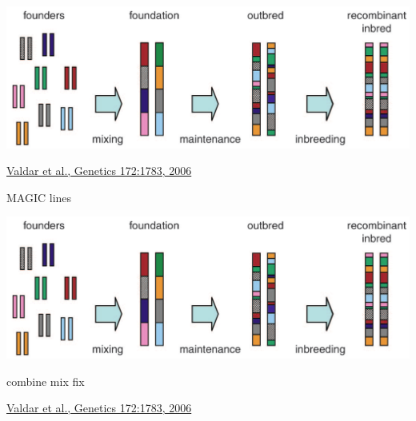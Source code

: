 \documentclass[12pt]{article}
\newcommand{\headsize}{\fontsize{35}{35} \selectfont}
\newcommand{\smallsize}{\fontsize{25}{30} \selectfont}
\newcommand{\smallestsize}{\fontsize{18}{22} \selectfont}
\begin{document}
\vspace{20mm}

\centerline{\includegraphics[width=10in]{Figs/valdar_genet2006.png}}

\vfill

\hfill {\smallestsize \color{myblue} \href{http://www.ncbi.nlm.nih.gov/pmc/articles/PMC1456308/}{Valdar et al., Genetics 172:1783, 2006}}

\vspace*{5mm}


\newpage

\addtocounter{page}{-1}

\headsize \color{myyellow}
\hfill \begin{minipage}{5.75in}
\centering
MAGIC lines
\end{minipage}

\vspace{20mm}

\centerline{\includegraphics[width=10in]{Figs/valdar_genet2006.png}}

\smallsize \color{myyellow}
\hspace*{52mm} combine \hspace*{35mm} mix \hspace*{52mm} fix

\vfill

\hfill {\smallestsize \color{myblue} \href{http://www.genetics.org/content/172/3/1783.full}{Valdar et al., Genetics 172:1783, 2006}}

\vspace*{5mm}


\newpage
\end{document}
